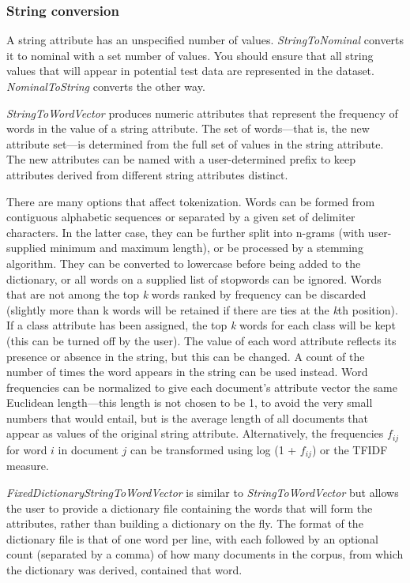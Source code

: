 \subsubsection{String conversion}

A string attribute has an unspecified number of
values. \textit{StringToNominal} converts it to nominal with a set
number of values. You should ensure that all string values that will
appear in potential test data are represented in the
dataset. \textit{NominalToString} converts the other way.

\textit{StringToWordVector} produces numeric attributes that represent
the frequency of words in the value of a string attribute. The set of
words—that is, the new attribute set---is determined from the full set
of values in the string attribute. The new attributes can be named
with a user-determined prefix to keep attributes derived from
different string attributes distinct.

There are many options that affect tokenization. Words can be formed
from contiguous alphabetic sequences or separated by a given set of
delimiter characters. In the latter case, they can be further split
into n-grams (with user-supplied minimum and maximum length), or be
processed by a stemming algorithm. They can be converted to lowercase
before being added to the dictionary, or all words on a supplied list
of stopwords can be ignored. Words that are not among the top
\textit{k} words ranked by frequency can be discarded (slightly more
than k words will be retained if there are ties at the \textit{k}th
position). If a class attribute has been assigned, the top \textit{k}
words for each class will be kept (this can be turned off by the
user). The value of each word attribute reflects its presence or
absence in the string, but this can be changed. A count of the number
of times the word appears in the string can be used instead. Word
frequencies can be normalized to give each document's attribute vector
the same Euclidean length---this length is not chosen to be 1, to
avoid the very small numbers that would entail, but is the average
length of all documents that appear as values of the original string
attribute. Alternatively, the frequencies $f_{ij}$ for word $i$ in
document $j$ can be transformed using log (1 + $f_{ij}$) or the TFIDF
measure.

\textit{FixedDictionaryStringToWordVector} is similar to
\textit{StringToWordVector} but allows the user to provide a
dictionary file containing the words that will form the attributes,
rather than building a dictionary on the fly.  The format of the
dictionary file is that of one word per line, with each followed by an
optional count (separated by a comma) of how many documents in the
corpus, from which the dictionary was derived, contained that word.

